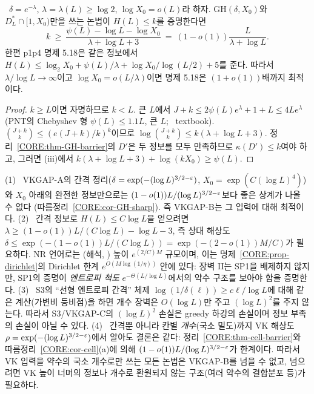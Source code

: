 \begin{corollary}\label{CORE:cor-GH-sharp}
\PROVED\ $\delta=e^{-\lambda}$, $\lambda=\lambda(L)\ge\log 2$, $\log X_0=o(L)$라 하자. $\mathrm{GH}(\delta,X_0)$와 $D^*_L\cap[1,X_0)$만을 쓰는 논법이 $H(L)\le k$를 증명한다면
\[
k\ \ge\ \frac{\psi(L)-\log L-\log X_0}{\lambda+\log L+3}\ =\ (1-o(1))\frac{L}{\lambda+\log L}.
\]
한편 p1p4 명제 5.18은 같은 정보에서 $H(L)\le\log_2X_0+\psi(L)/\lambda+\log X_0/\log(L/2)+5$를 준다. 따라서 $\lambda/\log L\to\infty$이고 $\log X_0=o(L/\lambda)$이면 명제 5.18은 $(1+o(1))$배까지 최적이다.
\end{corollary}
\begin{proof}
$k\ge L$이면 자명하므로 $k<L$. 큰 $L$에서 $J+k\le2\psi(L)e^\lambda+1+L\le4Le^\lambda$ (PNT의 Chebyshev 형 $\psi(L)\le1.1L$, 큰 $L$; \EXT\ textbook). $\binom{J+k}{k}\le(e(J+k)/k)^k$이므로 $\log\binom{J+k}{k}\le k(\lambda+\log L+3)$. 정리~\ref{CORE:thm-GH-barrier}의 $D'$은 두 정보를 모두 만족하므로 $\kappa(D')\le k$여야 하고, 그러면 (iii)에서 $k(\lambda+\log L+3)+\log(kX_0)\ge\psi(L)$.
\end{proof}

\begin{remark}\label{CORE:rem-VK-sharp}
(1) \PROVED\ VKGAP-A의 간격 정리($\delta=\exp(-(\log L)^{3/2-\varepsilon})$, $X_0=\exp(C(\log L)^4)$)와 $X_0$ 아래의 완전한 정보만으로는 $(1-o(1))L/(\log L)^{3/2-\varepsilon}$보다 좋은 상계가 나올 수 없다 (따름정리~\ref{CORE:cor-GH-sharp}). 즉 VKGAP-B는 그 입력에 대해 최적이다.
(2) \PROVED\ 간격 정보로 $H(L)\le C\log L$을 얻으려면 $\lambda\ge(1-o(1))L/(C\log L)-\log L-3$, 즉 상대 해상도 $\delta\le\exp(-(1-o(1))L/(C\log L))=\exp(-(2-o(1))M/C)$가 필요하다. NR 언어로는 (해석, \HEUR) 높이 $e^{(2/C)M}$ 규모이며, 이는 명제~\ref{CORE:prop-dirichlet}의 Dirichlet 한계 $e^{O(M\log(1/\eta))}$ 안에 있다: 장벽 II는 SP1을 배제하지 않지만, SP1의 증명이 \emph{엔트로피 척도} $e^{-\Theta(L/\log L)}$에서의 약수 구조를 보아야 함을 증명한다.
(3) \HEUR\ S3의 ``선형 엔트로피 간격'' 체제 $\log(1/\delta(\ell))\ge c\ell/\log L$에 대해 같은 계산(가변비 등비점)을 하면 개수 장벽은 $O(\log L)$만 주고 $(\log L)^2$를 주지 않는다. 따라서 S3/VKGAP-C의 $(\log L)^2$ 손실은 greedy 하강의 손실이며 정보 부족의 손실이 아닐 수 있다.
(4) \PROVED\ 간격뿐 아니라 칸별 \emph{개수}(국소 밀도)까지 VK 해상도 $\rho=\exp(-(\log L)^{3/2-\varepsilon})$에서 알아도 결론은 같다: 정리~\ref{CORE:thm-cell-barrier}와 따름정리~\ref{CORE:cor-cell}(a)에 의해 $(1-o(1))L/(\log L)^{3/2-\varepsilon}$가 한계이다. 따라서 VK 입력을 약수의 국소 개수로만 쓰는 모든 논법은 VKGAP-B를 넘을 수 없고, 넘으려면 VK 높이 너머의 정보나 개수로 환원되지 않는 구조(여러 약수의 결합분포 등)가 필요하다.
\end{remark}

